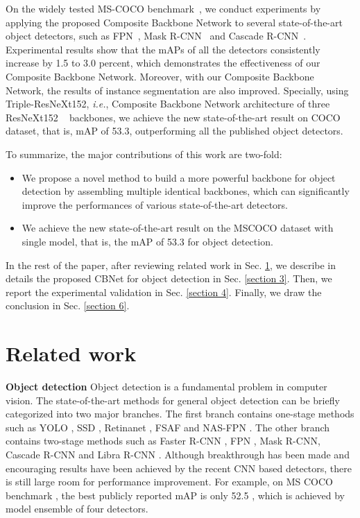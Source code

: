 \documentclass[letterpaper]{article} \usepackage{aaai20}  \usepackage{multirow}
\begin{document}
On the widely tested MS-COCO benchmark~\cite{lin2014microsoft}, we conduct experiments by applying the proposed Composite Backbone Network to several state-of-the-art object detectors, such as FPN~\cite{lin2017feature}, Mask R-CNN~\cite{he2017mask} and Cascade R-CNN~\cite{cai18cascadercnn}. Experimental results show that the mAPs of all the detectors consistently increase by 1.5 to 3.0 percent, which demonstrates the effectiveness of our Composite Backbone Network. Moreover, with our Composite Backbone Network, the results of instance segmentation are also improved. Specially, using Triple-ResNeXt152, \textit{i.e.}, Composite Backbone Network architecture of three ResNeXt152 ~\cite{xie2017aggregated} backbones, we achieve the new state-of-the-art result on COCO dataset, that is, mAP of 53.3, outperforming all the published object detectors. 

To summarize, the major contributions of this work are two-fold:
\begin{itemize}
	\item We propose a novel method to build a more powerful backbone for object detection by assembling multiple identical backbones, which can significantly improve the performances of various state-of-the-art detectors.
	\item We achieve the new state-of-the-art result on the MSCOCO dataset with single model, that is, the mAP of 53.3 for object detection.
\end{itemize}




In the rest of the paper, after reviewing related work in Sec. \ref{section 2}, we describe in details the proposed CBNet for object detection in Sec. \ref{section 3}. Then, we report the experimental validation in Sec. \ref{section 4}. Finally, we draw the conclusion in Sec. \ref{section 6}.

\section{Related work}
\label{section 2}


\textbf{Object detection}
Object detection is a fundamental problem in computer vision. The state-of-the-art methods for general object detection can be briefly categorized into two major branches. The first branch contains one-stage methods such as YOLO \cite{Redmon_2016_CVPR}, SSD  \cite{liu2015ssd}, Retinanet \cite{lin2017focal}, FSAF \cite{zhu2019feature} and NAS-FPN \cite{ghiasi2019fpn}. The other branch contains two-stage methods such as Faster R-CNN \cite{ren2015faster}, FPN \cite{lin2017feature}, Mask R-CNN\cite{he2017mask}, Cascade R-CNN\cite{cai18cascadercnn} and Libra R-CNN \cite{pang2019libra}. Although breakthrough has been made and encouraging results have been achieved by the recent CNN based detectors, there is still large room for performance improvement. For example, on MS COCO benchmark \cite{lin2014microsoft}, the best publicly reported mAP is only 52.5 \cite{peng2018megdet}, which is achieved by model ensemble of four detectors.
\end{document}
